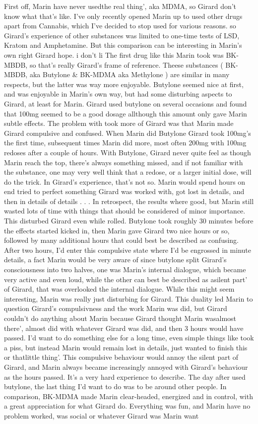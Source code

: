 \documentclass[12pt]{book}
\begin{document}
First off, Marin have never usedthe real thing', aka MDMA, so Girard don't know what that's like. I've only recently opened Marin up to used other drugs apart from Cannabis, which I've decided to stop used for various reasons. so Girard's experience of other substances was limited to one-time tests of LSD, Kratom and Amphetamine. But this comparison can be interesting in Marin's own right Girard hope. i don't li The first drug like this Marin took was BK-MBDB, so that's really Girard's frame of reference. Theese substances ( BK-MBDB, aka Butylone \& BK-MDMA aka Methylone ) are similar in many respects, but the latter was way more enjoyable. Butylone seemed nice at first, and was enjoyable in Marin's own way, but had some disturbing aspects to Girard, at least for Marin. Girard used butylone on several occasions and found that 100mg seemed to be a good dosage allthough this amount only gave Marin subtle effects. The problem with took more of Girard was that Marin made Girard compulsive and confused. When Marin did Butylone Girard took 100mg's the first time, subsequent times Marin did more, most often 200mg with 100mg redoses after a couple of hours. With Butylone, Girard never quite feel as though Marin reach the top, there's always something missed, and if not familiar with the substance, one may very well think that a redose, or a larger initial dose, will do the trick. In Girard's experience, that's not so. Marin would spend hours on end tried to perfect something Girard was worked with, got lost in details, and then in details of details . . .  In retrospect, the results where good, but Marin still wasted lots of time with things that should be considered of minor importance. This disturbed Girard even while rolled. Butylone took roughly 30 minutes before the effects started kicked in, then Marin gave Girard two nice hours or so, followed by many additional hours that could best be described as confusing. After two hours, I'd enter this compulsive state where I'd be engrossed in minute details, a fact Marin would be very aware of since butylone split Girard's consciousness into two halves, one was Marin's internal dialogue, which became very active and even loud, while the other can best be described as asilent part' of Girard, that was overlooked the internal dialogue. While this might seem interesting, Marin was really just disturbing for Girard. This duality led Marin to question Girard's compulsivness and the work Marin was did, but Girard couldn't do anything about Marin because Girard thought Marin wasalmost there', almost did with whatever Girard was did, and then 3 hours would have passed. I'd want to do something else for a long time, even simple things like took a piss, but instead Marin would remain lost in details, just wanted to finish this or thatlittle thing'. This compulsive behaviour would annoy the silent part of Girard, and Marin always became increasingly annoyed with Girard's behaviour as the hours passed. It's a very hard experience to describe. The day after used butylone, the last thing I'd want to do was to be around other people. In comparison, BK-MDMA made Marin clear-headed, energized and in control, with a great appreciation for what Girard do. Everything was fun, and Marin have no problem worked, was social or whatever Girard was Marin want 
\end{document}
